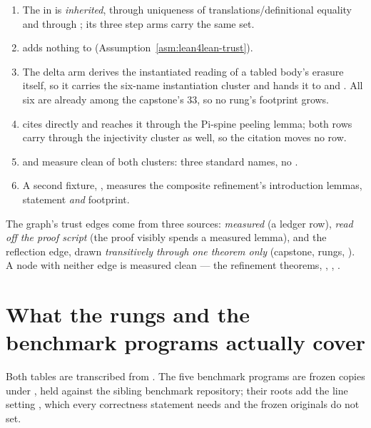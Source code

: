 \begin{enumerate}
\item The  in  is \emph{inherited}, through uniqueness of
translations/definitional equality and through ; its three step arms
carry the same set.
\item {} adds nothing to  (Assumption~\ref{asm:lean4lean-trust}).
\item The delta arm derives the instantiated reading of a tabled body's erasure itself, so it
carries the six-name instantiation cluster and hands it to  and
. All six are already among the capstone's 33, so no rung's footprint
grows.
\item {} cites  directly and
 reaches it through the Pi-spine peeling lemma; both rows carry
 through the injectivity cluster as well, so the citation moves no row.
\item {} and  measure clean of both
clusters: three standard names, no .
\item A second fixture, , measures the composite refinement's
introduction lemmas, statement \emph{and} footprint.
\end{enumerate}

\begin{remark}
 The graph's trust edges come from three sources: \emph{measured} (a ledger row),
\emph{read off the proof script} (the proof visibly spends a measured lemma), and the reflection
edge, drawn \emph{transitively through one theorem only} (capstone, rungs,
). A node with neither edge is measured clean --- the
refinement theorems, , , .
\end{remark}

\section{What the rungs and the benchmark programs actually cover}
\label{sec:trust:coverage}

Both tables are transcribed from . The five benchmark programs are frozen
copies under , held against the sibling benchmark repository; their roots
add the  line setting , which every correctness statement
needs and the frozen originals do not set.

